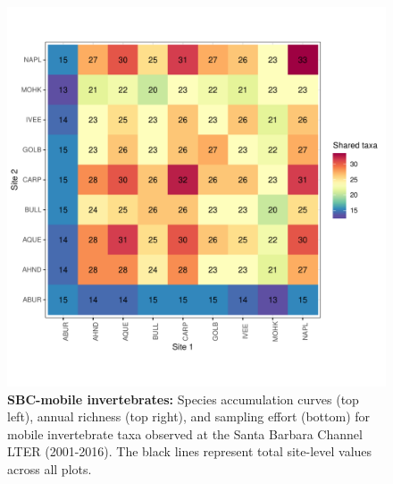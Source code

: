 \documentclass[11pt, oneside]{article}
\begin{document}
\begin{figure}[h!]
\includegraphics[scale = 0.4]{sbc-mobileInverts-castorani_spp_shared.pdf}
\caption{{\bf SBC-mobile invertebrates:} Species accumulation curves (top left),  annual richness (top right), and sampling effort (bottom)  for mobile invertebrate taxa observed at  the Santa Barbara Channel LTER (2001-2016). The black lines represent total site-level values across all plots.}
\label{sbc-mobileInverts}
\end{figure}
\end{document}
